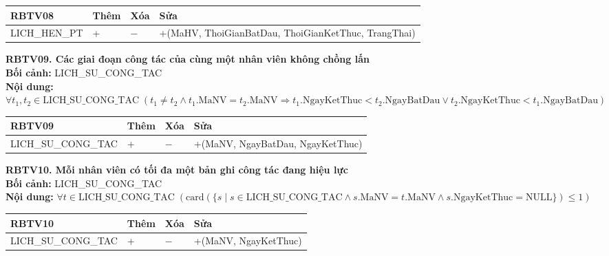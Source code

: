 \documentclass[11pt, a4paper]{article}
\begin{document}
\vspace{0.3em}
\begin{small}
\begin{tabularx}{\textwidth}{| C{4.2cm} | C{2cm} | C{2cm} | Y |}
\hline
\textbf{RBTV08} & \textbf{Thêm} & \textbf{Xóa} & \textbf{Sửa} \\
\hline
LICH\_HEN\_PT & + & $-$ & +(MaHV, ThoiGianBatDau, ThoiGianKetThuc, TrangThai) \\
\hline
\end{tabularx}
\end{small}

\vspace{0.8em}
\textbf{RBTV09. Các giai đoạn công tác của cùng một nhân viên không chồng lấn} \\
\textbf{Bối cảnh:} LICH\_SU\_CONG\_TAC \\
\textbf{Nội dung:} $\forall t_1, t_2 \in \text{LICH\_SU\_CONG\_TAC} \; (t_1 \neq t_2 \land t_1.\text{MaNV} = t_2.\text{MaNV} \Rightarrow t_1.\text{NgayKetThuc} < t_2.\text{NgayBatDau} \lor t_2.\text{NgayKetThuc} < t_1.\text{NgayBatDau})$

\vspace{0.3em}
\begin{small}
\begin{tabularx}{\textwidth}{| C{4.2cm} | C{2cm} | C{2cm} | Y |}
\hline
\textbf{RBTV09} & \textbf{Thêm} & \textbf{Xóa} & \textbf{Sửa} \\
\hline
LICH\_SU\_CONG\_TAC & + & $-$ & +(MaNV, NgayBatDau, NgayKetThuc) \\
\hline
\end{tabularx}
\end{small}

\vspace{0.8em}
\textbf{RBTV10. Mỗi nhân viên có tối đa một bản ghi công tác đang hiệu lực} \\
\textbf{Bối cảnh:} LICH\_SU\_CONG\_TAC \\
\textbf{Nội dung:} $\forall t \in \text{LICH\_SU\_CONG\_TAC} \; (\text{card}(\{s \mid s \in \text{LICH\_SU\_CONG\_TAC} \land s.\text{MaNV} = t.\text{MaNV} \land s.\text{NgayKetThuc} = \text{NULL}\}) \le 1)$

\vspace{0.3em}
\begin{small}
\begin{tabularx}{\textwidth}{| C{4.2cm} | C{2cm} | C{2cm} | Y |}
\hline
\textbf{RBTV10} & \textbf{Thêm} & \textbf{Xóa} & \textbf{Sửa} \\
\hline
LICH\_SU\_CONG\_TAC & + & $-$ & +(MaNV, NgayKetThuc) \\
\hline
\end{tabularx}
\end{small}
\end{document}
